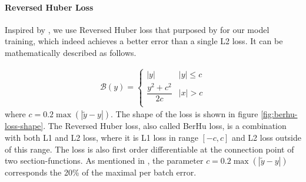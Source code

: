 %
%


\paragraph{Reversed Huber Loss}
Inspired by \cite{img2depth}, we use Reversed Huber loss that purposed by \cite{berhu-loss} for our model training, which indeed achieves a better error than a single L2 loss. It can be mathematically described as follows.

\begin{equation}\label{berhu-loss}
	\begin{array}{ll}
		\mathcal{B}(y)= \begin{cases}
			|y| & |y| \le c \\
			\dfrac{y^2 + c^2}{2c} & |x| > c\\
		\end{cases}
	\end{array}
\end{equation}
where $ c=0.2\max (|\tilde y - y|) $. The shape of the loss is shown in figure \ref{fig:berhu-loss-shape}. The Reversed Huber loss, also called BerHu loss, is a combination with both L1 and L2 loss, where it is L1 loss in range $ [-c,c] $ and L2 loss outside of this range. The loss is also first order differentiable at the connection point of two section-functions. As mentioned in \cite{img2depth}, the parameter $ c=0.2 \max(|\tilde y - y|) $ corresponds the 20\% of the maximal per batch error. 

